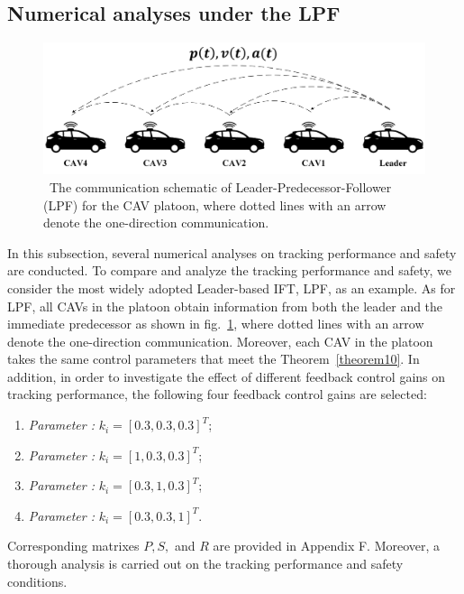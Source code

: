 \documentclass[a4paper]{cas-sc}
\begin{document}
\subsection{Numerical analyses under the LPF}
\label{Section 5.2}
\begin{figure}
  \centering
  \includegraphics[width=12cm]{figs/fig2.png}
  \caption{~The communication schematic of Leader-Predecessor-Follower (LPF) for the CAV platoon, where dotted lines with an arrow denote the one-direction communication.}
  \label{fig2}
\end{figure}

In this subsection, several numerical analyses on tracking performance and safety are conducted. To compare and analyze the tracking performance and safety, we consider the most widely adopted Leader-based IFT, LPF, as an example. As for LPF, all CAVs in the platoon obtain information from both the leader and the immediate predecessor as shown in fig.~\ref{fig2}, where dotted lines with an arrow denote the one-direction communication. Moreover, each CAV in the platoon takes the same control parameters that meet the Theorem~\ref{theorem10}. In addition, in order to investigate the effect of different feedback control gains on tracking performance, the following four feedback control gains are selected:
\begin{enumerate}
  \item \textit{Parameter \uppercase\expandafter{}:} $ {k_i} = {[0.3,0.3,0.3]^T} $;
  \item \textit{Parameter \uppercase\expandafter{}:} $ {k_i} = {[1,0.3,0.3]^T} $;
  \item \textit{Parameter \uppercase\expandafter{}:} $ {k_i} = {[0.3,1,0.3]^T} $;
  \item \textit{Parameter \uppercase\expandafter{}:} $ {k_i} = {[0.3,0.3,1]^T} $.
\end{enumerate}
Corresponding matrixes $ P,S,$ and $R$ are provided in Appendix F. Moreover, a thorough analysis is carried out on the tracking performance and safety conditions.
\end{document}

